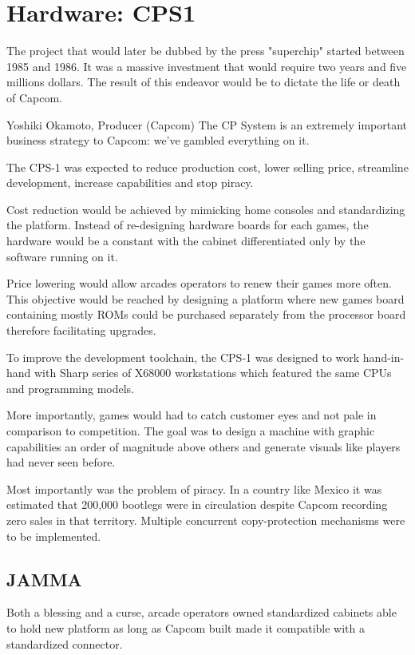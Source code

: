 \chapter{Hardware: CPS1}

The project that would later be dubbed by the press "superchip"\cite{tgm198906} started between 1985 and 1986. It was a massive investment that would require two years and five millions dollars. The result of this endeavor would be to dictate the life or death of Capcom.

\begin{q}{Yoshiki Okamoto, Producer (Capcom)\cite{gamest38}}
The CP System is an extremely important business strategy to Capcom: we’ve gambled everything on it.
\end{q}

The CPS-1 was expected to reduce production cost, lower selling price, streamline development, increase capabilities and stop piracy. 

Cost reduction would be achieved by mimicking home consoles and standardizing the platform. Instead of re-designing hardware boards for each games, the hardware would be a constant with the cabinet differentiated only by the software running on it.

Price lowering would allow arcades operators to renew their games more often. This objective would be reached by designing a platform where new games board containing mostly ROMs could be purchased separately from the processor board therefore facilitating upgrades.

To improve the development toolchain, the CPS-1 was designed to work hand-in-hand with Sharp series of X68000 workstations which featured the same CPUs and programming models.

More importantly, games would had to catch customer eyes and not pale in comparison to competition. The goal was to design a machine with graphic capabilities an order of magnitude above others and generate visuals like players had never seen before.

Most importantly was the problem of piracy. In a country like Mexico it was estimated that 200,000 bootlegs were in circulation\cite{sf2_oral_history} despite Capcom recording zero sales in that territory. Multiple concurrent copy-protection mechanisms were to be implemented.


\section{JAMMA}
Both a blessing and a curse, arcade operators owned  standardized cabinets able to hold new platform as long as Capcom built made it compatible with a standardized connector. 

